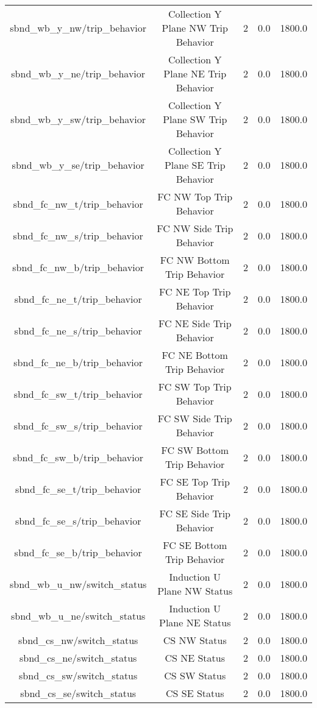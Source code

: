 \begin{center}
\begin{longtable}{c | c c c c }
sbnd\_wb\_y\_nw/trip\_behavior & Collection Y Plane NW Trip Behavior & 2 & 0.0 & 1800.0\\ 
sbnd\_wb\_y\_ne/trip\_behavior & Collection Y Plane NE Trip Behavior & 2 & 0.0 & 1800.0\\ 
sbnd\_wb\_y\_sw/trip\_behavior & Collection Y Plane SW Trip Behavior & 2 & 0.0 & 1800.0\\ 
sbnd\_wb\_y\_se/trip\_behavior & Collection Y Plane SE Trip Behavior & 2 & 0.0 & 1800.0\\ 
sbnd\_fc\_nw\_t/trip\_behavior & FC NW Top Trip Behavior & 2 & 0.0 & 1800.0\\ 
sbnd\_fc\_nw\_s/trip\_behavior & FC NW Side Trip Behavior & 2 & 0.0 & 1800.0\\ 
sbnd\_fc\_nw\_b/trip\_behavior & FC NW Bottom Trip Behavior & 2 & 0.0 & 1800.0\\ 
sbnd\_fc\_ne\_t/trip\_behavior & FC NE Top Trip Behavior & 2 & 0.0 & 1800.0\\ 
sbnd\_fc\_ne\_s/trip\_behavior & FC NE Side Trip Behavior & 2 & 0.0 & 1800.0\\ 
sbnd\_fc\_ne\_b/trip\_behavior & FC NE Bottom Trip Behavior & 2 & 0.0 & 1800.0\\ 
sbnd\_fc\_sw\_t/trip\_behavior & FC SW Top Trip Behavior & 2 & 0.0 & 1800.0\\ 
sbnd\_fc\_sw\_s/trip\_behavior & FC SW Side Trip Behavior & 2 & 0.0 & 1800.0\\ 
sbnd\_fc\_sw\_b/trip\_behavior & FC SW Bottom Trip Behavior & 2 & 0.0 & 1800.0\\ 
sbnd\_fc\_se\_t/trip\_behavior & FC SE Top Trip Behavior & 2 & 0.0 & 1800.0\\ 
sbnd\_fc\_se\_s/trip\_behavior & FC SE Side Trip Behavior & 2 & 0.0 & 1800.0\\ 
sbnd\_fc\_se\_b/trip\_behavior & FC SE Bottom Trip Behavior & 2 & 0.0 & 1800.0\\ 
sbnd\_wb\_u\_nw/switch\_status & Induction U Plane NW Status & 2 & 0.0 & 1800.0\\ 
sbnd\_wb\_u\_ne/switch\_status & Induction U Plane NE Status & 2 & 0.0 & 1800.0\\ 
sbnd\_cs\_nw/switch\_status & CS NW Status & 2 & 0.0 & 1800.0\\ 
sbnd\_cs\_ne/switch\_status & CS NE Status & 2 & 0.0 & 1800.0\\ 
sbnd\_cs\_sw/switch\_status & CS SW Status & 2 & 0.0 & 1800.0\\ 
sbnd\_cs\_se/switch\_status & CS SE Status & 2 & 0.0 & 1800.0\\ 

\end{longtable}
\end{center}
